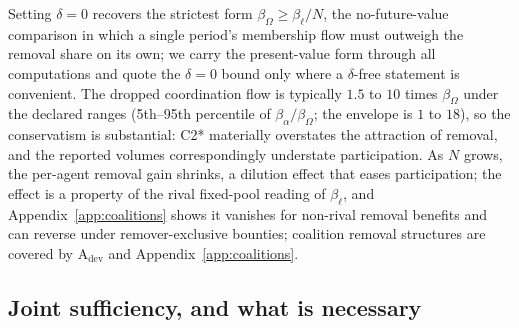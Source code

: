 \documentclass[manuscript,screen,review]{jair}
\begin{document}
Setting $\delta = 0$ recovers the strictest form $\beta_\Omega \geq \beta_\ell/N$, the no-future-value comparison in which a single period's membership flow must outweigh the removal share on its own; we carry the present-value form through all computations and quote the $\delta = 0$ bound only where a $\delta$-free statement is convenient. The dropped coordination flow is typically $1.5$ to $10$ times $\beta_\Omega$ under the declared ranges (5th--95th percentile of $\beta_\alpha/\beta_\Omega$; the envelope is $1$ to $18$), so the conservatism is substantial: C2* materially overstates the attraction of removal, and the reported volumes correspondingly understate participation. As $N$ grows, the per-agent removal gain shrinks, a dilution effect that eases participation; the effect is a property of the rival fixed-pool reading of $\beta_\ell$, and Appendix~\ref{app:coalitions} shows it vanishes for non-rival removal benefits and can reverse under remover-exclusive bounties; coalition removal structures are covered by A$_{\mathrm{dev}}$ and Appendix~\ref{app:coalitions}.

\subsection{Joint sufficiency, and what is necessary}
\label{sec:proof-stability}
\end{document}
